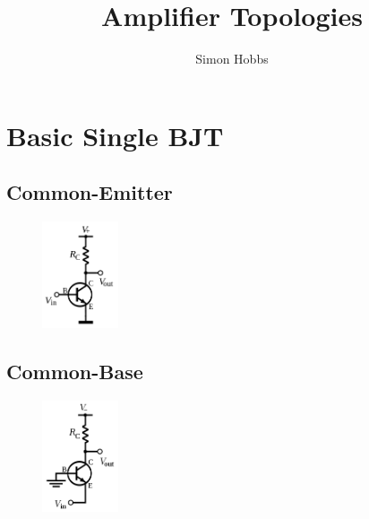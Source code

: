 \documentclass{report}
\title{Amplifier Topologies}
\author{Simon Hobbs}
\newcommand{\imwidth}{0.2\textwidth}
\begin{document}
\maketitle

\chapter{Basic Single BJT}
\section{Common-Emitter}
\begin{figure}
\centering
\includegraphics[width = \imwidth]{NPN_common_emitter}
\caption{}
\end{figure}

\section{Common-Base}
\begin{figure}
\centering
\includegraphics[width = \imwidth]{NPN_common_base}
\caption{}
\end{figure}
\end{document}
